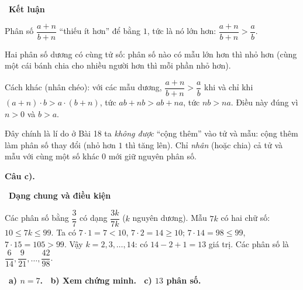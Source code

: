 \documentclass[11pt]{article}
\providecommand{\AnsWord}{Đáp số}
\newcommand{\ans}[1]{\par\smallskip{\bfseries\color{tmGreen!88!black}\AnsWord:}\ {\bfseries\color{AnsRed}#1}\par}
\newcommand{\step}[2]{\par\smallskip\noindent{\bfseries\color{tmBlue!85!black}\StepWord~#1.}\ {\bfseries #2}\par\nopagebreak}
\def\AnsWord{Đáp số}
\def\StepWord{Bước}
\begin{document}
{\step{5}{Kết luận}
Phân số $\dfrac{a+n}{b+n}$ ``thiếu ít hơn'' để bằng $1$, tức là nó lớn hơn: $\dfrac{a+n}{b+n}>\dfrac ab$.

\begin{recallbox}Hai phân số dương có cùng tử số: phân số nào có mẫu lớn hơn thì nhỏ hơn (cùng một cái bánh chia cho nhiều người hơn thì mỗi phần nhỏ hơn).\end{recallbox}

\begin{proofbox}Cách khác (nhân chéo): với các mẫu dương, $\dfrac{a+n}{b+n}>\dfrac ab$ khi và chỉ khi $(a+n)\cdot b>a\cdot(b+n)$, tức $ab+nb>ab+na$, tức $nb>na$. Điều này đúng vì $n>0$ và $b>a$.\end{proofbox}

\begin{warnbox}Đây chính là lí do ở Bài 18 ta \emph{không được} ``cộng thêm'' vào tử và mẫu: cộng thêm làm phân số thay đổi (nhỏ hơn $1$ thì tăng lên). Chỉ \emph{nhân} (hoặc chia) cả tử và mẫu với cùng một số khác $0$ mới giữ nguyên phân số.\end{warnbox}

\par\smallskip\textbf{Câu c).}
\step{6}{Dạng chung và điều kiện}
Các phân số bằng $\dfrac37$ có dạng $\dfrac{3k}{7k}$ ($k$ nguyên dương). Mẫu $7k$ có hai chữ số: $10\le 7k\le 99$. Ta có $7\cdot 1=7<10$, $7\cdot 2=14\ge 10$; $7\cdot 14=98\le 99$, $7\cdot 15=105>99$. Vậy $k=2,3,\dots,14$: có $14-2+1=13$ giá trị.
Các phân số là $\dfrac{6}{14},\dfrac{9}{21},\dots,\dfrac{42}{98}$.

\ans{a) $n=7$. \ b) Xem chứng minh. \ c) $13$ phân số.}
}
\end{document}
